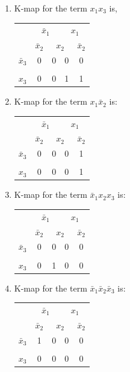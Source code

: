 \documentclass[twocolumn]{article}
\newcommand{\bx}{\bar{x}}
\begin{document}
\begin{enumerate}
  \item 
K-map for the term $x_1x_3$ is,
\begin{tabular}{c|c|c|c|c}
  \toprule
  & \multicolumn{2}{c|}{$\bx_1$} & \multicolumn{2}{c}{$x_1$}
  \\
  & $\bx_2$ & \multicolumn{2}{c|}{$x_2$} & $\bx_2$ \\
  \midrule
  $\bx_3$ & 0 & 0 & 0 & 0\\
  \\
  $x_3$   & 0 & 0 & 1 & 1\\
  \bottomrule
\end{tabular}

\item 
K-map for the term $x_1\bx_2$ is:
\begin{tabular}{c|c|c|c|c}
  \toprule
  & \multicolumn{2}{c|}{$\bx_1$} & \multicolumn{2}{c}{$x_1$}
  \\
  & $\bx_2$ & \multicolumn{2}{c|}{$x_2$} & $\bx_2$ \\
  \midrule
  $\bx_3$ & 0 & 0 & 0 & 1\\
  \\
  $x_3$   & 0 & 0 & 0 & 1\\
  \bottomrule
\end{tabular}


\item 
K-map for the term $\bx_1x_2x_3$ is:
\begin{tabular}{c|c|c|c|c}
  \toprule
  & \multicolumn{2}{c|}{$\bx_1$} & \multicolumn{2}{c}{$x_1$}
  \\
  & $\bx_2$ & \multicolumn{2}{c|}{$x_2$} & $\bx_2$ \\
  \midrule
  $\bx_3$ & 0 & 0 & 0 & 0\\
  \\
  $x_3$   & 0 & 1 & 0 & 0\\
  \bottomrule
\end{tabular}

\item 
K-map for the term $\bx_1\bx_2\bx_3$ is:
\begin{tabular}{c|c|c|c|c}
  \toprule
  & \multicolumn{2}{c|}{$\bx_1$} & \multicolumn{2}{c}{$x_1$}
  \\
  & $\bx_2$ & \multicolumn{2}{c|}{$x_2$} & $\bx_2$ \\
  \midrule
  $\bx_3$ & 1 & 0 & 0 & 0\\
  \\
  $x_3$   & 0 & 0 & 0 & 0\\
  \bottomrule
\end{tabular}
\end{enumerate}
\end{document}
